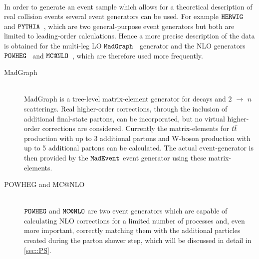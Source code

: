 \\
In order to generate an event sample which allows for a theoretical description of real collision events several event generators can be used.
For example $\texttt{HERWIG}$~\cite{Herwig} and $\texttt{PYTHIA}$~\cite{Pythia}, which are two general-purpose event generators but both are limited to leading-order calculations.
Hence a more precise description of the data is obtained for the multi-leg LO $\texttt{MadGraph}$~\cite{MadGraphManual} generator and the NLO generators $\texttt{POWHEG}$~\cite{PowhegMethod} and $\texttt{MC@NLO}$~\cite{Frixione:2008ym}, which are therefore used more frequently.
\begin{myindentpar}
  \begin{description}
    \item[MadGraph] \hfill \\
      MadGraph is a tree-level matrix-element generator for decays and $2$ $\rightarrow$ $n$ scatterings. %
      Real higher-order corrections, through the inclusion of additional final-state partons, can be incorporated, but no virtual higher-order corrections are considered.
      Currently the matrix-elements for $t\bar{t}$ production with up to 3 additional partons and W-boson production with up to 5 additional partons can be calculated.
      The actual event-generator is then provided by the $\texttt{MadEvent}$ event generator using these matrix-elements.
    \item[POWHEG and MC$@$NLO] \hfill \\
      $\texttt{POWHEG}$ and $\texttt{MC@NLO}$ are two event generators which are capable of calculating NLO corrections for a limited number of processes and, even more important, correctly matching them with the additional particles created during the parton shower step, which will be discussed in detail in \ref{sec::PS}.
  \end{description}
\end{myindentpar}


